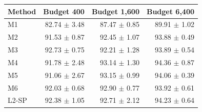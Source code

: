 \begin{tabular}{lrrr}\toprule
Method & Budget 400 & Budget 1,600 & Budget 6,400\\\midrule
M1 & 82.74 $\pm$ 3.48 & 87.47 $\pm$ 0.85 & 89.91 $\pm$ 1.02 \\
M2 & 91.53 $\pm$ 0.87 & 92.45 $\pm$ 1.07 & 93.88 $\pm$ 0.49 \\
M3 & 92.73 $\pm$ 0.75 & 92.21 $\pm$ 1.28 & 93.89 $\pm$ 0.54 \\
M4 & 91.78 $\pm$ 2.48 & 93.14 $\pm$ 1.30 & 94.36 $\pm$ 0.87 \\
M5 & 91.06 $\pm$ 2.67 & 93.15 $\pm$ 0.99 & 94.06 $\pm$ 0.39 \\
M6 & 92.03 $\pm$ 0.68 & 92.90 $\pm$ 0.77 & 93.92 $\pm$ 0.61 \\
L2-SP & 92.38 $\pm$ 1.05 & 92.71 $\pm$ 2.12 & 94.23 $\pm$ 0.64 \\
\bottomrule\end{tabular}
